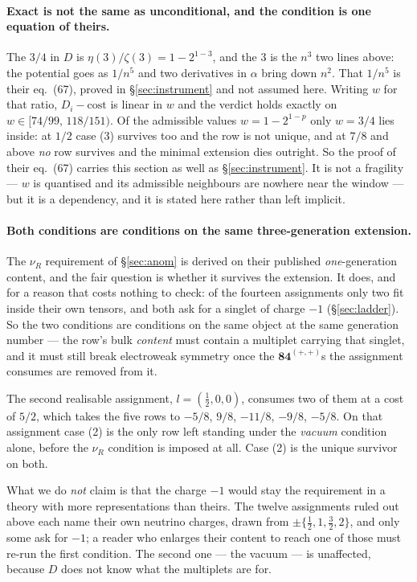 \documentclass[11pt,a4paper]{article}
\newcommand{\rep}[1]{\mathbf{#1}}
\begin{document}
\paragraph{Exact is not the same as unconditional, and the condition is one equation of theirs.}
The $3/4$ in $D$ is $\eta(3)/\zeta(3)=1-2^{1-3}$, and the $3$ is the $n^3$ two lines above: the
potential goes as $1/n^5$ and two derivatives in $\alpha$ bring down $n^2$. That $1/n^5$ is their
eq.~(67), proved in \S\ref{sec:instrument} and not assumed here. Writing
$w$ for that ratio, $D_i-\text{cost}$ is linear in $w$ and the verdict holds exactly on
$w\in[74/99,\,118/151)$. Of the admissible values $w=1-2^{1-p}$ only $w=3/4$ lies inside: at $1/2$
case (3) survives too and the row is not unique, and at $7/8$ and above \emph{no} row survives and
the minimal extension dies outright. So the proof of their eq.~(67) carries this section as well as
\S\ref{sec:instrument}. It is not a fragility --- $w$ is quantised and its admissible neighbours are
nowhere near the window --- but it is a dependency, and it is stated here rather than left implicit.

\paragraph{Both conditions are conditions on the same three-generation extension.} The $\nu_R$
requirement of \S\ref{sec:anom} is derived on their published \emph{one}-generation content, and the
fair question is whether it survives the extension. It does, and for a reason that costs nothing to
check: of the fourteen assignments only two fit inside their own tensors, and both ask for a singlet
of charge $-1$ (\S\ref{sec:ladder}). So the two conditions are conditions on the same object at the
same generation number --- the row's bulk \emph{content} must contain a multiplet carrying that
singlet, and it must still break electroweak symmetry once the $\rep{84}^{(+,+)}$s the assignment
consumes are removed from it.

The second realisable assignment, $l=(\tfrac12,0,0)$, consumes two of them at a cost of $5/2$, which
takes the five rows to $-5/8$, $9/8$, $-11/8$, $-9/8$, $-5/8$. On that assignment case (2)
is the only row left standing under the \emph{vacuum} condition alone, before the $\nu_R$ condition
is imposed at all. Case (2) is the unique survivor on both.

What we do \emph{not} claim is that the charge $-1$ would stay the requirement in a theory with more
representations than theirs. The twelve assignments ruled out above each name their own neutrino
charges, drawn from $\pm\{\tfrac12,1,\tfrac32,2\}$, and only some ask for $-1$; a reader who enlarges
their content to reach one of those must re-run the first condition. The second one --- the vacuum
--- is unaffected, because $D$ does not know what the multiplets are for.
\end{document}
